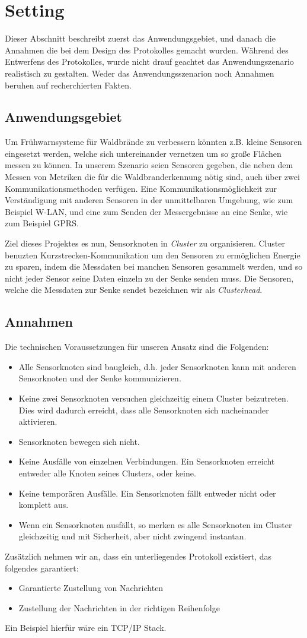 \section{Setting} \label{sec:setting}
Dieser Abschnitt beschreibt zuerst das Anwendungsgebiet, und danach die Annahmen die bei dem Design des Protokolles gemacht wurden.
W\"ahrend des Entwerfens des Protokolles, wurde nicht drauf geachtet das Anwendungszenario realistisch zu gestalten. Weder das Anwendungsszenarion noch Annahmen beruhen auf recherchierten Fakten.

\subsection{Anwendungsgebiet}
Um Fr\"uhwarnsysteme f\"ur Waldbr\"ande zu verbessern k\"onnten z.B. kleine Sensoren eingesetzt werden, welche sich untereinander vernetzen um so gro\ss e Fl\"achen messen zu k\"onnen.
In unserem Szenario seien Sensoren gegeben, die neben dem Messen von Metriken die f\"ur die Waldbranderkennung n\"otig sind, auch \"uber zwei Kommunikationsmethoden verf\"ugen. Eine Kommunikationsm\"oglichkeit zur Verst\"andigung mit anderen Sensoren in der unmittelbaren Umgebung, wie zum Beispiel W-LAN, und eine zum Senden der Messergebnisse an eine Senke, wie zum Beispiel GPRS.

Ziel dieses Projektes es nun, Sensorknoten in \emph{Cluster} zu organisieren.
Cluster benuzten Kurzstrecken-Kommunikation um den Sensoren zu erm\"oglichen Energie zu sparen, indem die Messdaten bei manchen Sensoren gesammelt werden, und so nicht jeder Sensor seine Daten einzeln zu der Senke senden muss.
Die Sensoren, welche die Messdaten zur Senke sendet bezeichnen wir als \emph{Clusterhead}.

\subsection{Annahmen}
Die technischen Voraussetzungen f\"ur unseren Ansatz sind die Folgenden:
\begin{itemize}
\item Alle Sensorknoten sind baugleich, d.h. jeder Sensorknoten kann mit anderen Sensorknoten und der Senke kommunizieren.
\item Keine zwei Sensorknoten versuchen gleichzeitig einem Cluster beizutreten. Dies wird  dadurch erreicht, dass alle  Sensorknoten sich nacheinander aktivieren.
\item Sensorknoten bewegen sich nicht.
\item Keine Ausfälle von einzelnen Verbindungen. Ein Sensorknoten erreicht entweder alle Knoten seines Clusters, oder keine.
\item Keine tempor\"aren Ausf\"alle. Ein Sensorknoten f\"allt entweder nicht oder komplett aus.
\item Wenn ein Sensorknoten ausf\"allt, so merken es alle Sensorknoten im Cluster gleichzeitig und mit Sicherheit, aber nicht zwingend instantan.
\end{itemize}

\noindent Zus\"atzlich nehmen wir an, dass ein unterliegendes Protokoll existiert, das folgendes garantiert:
\begin{itemize}
\item Garantierte Zustellung von Nachrichten
\item Zustellung der Nachrichten in der richtigen Reihenfolge
\end{itemize}
Ein Beispiel hierf\"ur w\"are ein TCP/IP Stack.
